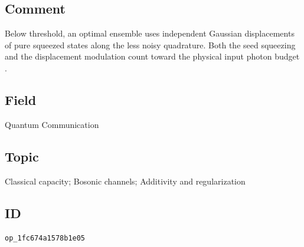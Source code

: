 \subsection*{Comment}

Below threshold, an optimal ensemble uses independent Gaussian displacements of pure squeezed states along the less noisy quadrature. Both the seed squeezing and the displacement modulation count toward the physical input photon budget .

\subsection*{Field}

Quantum Communication

\subsection*{Topic}

Classical capacity; Bosonic channels; Additivity and regularization

\subsection*{ID}

\texttt{op\_1fc674a1578b1e05}
